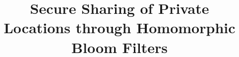\documentclass[conference]{IEEEtran}
\begin{document}
\title{Secure Sharing of Private Locations through Homomorphic Bloom Filters}



\maketitle

\begin{abstract}

\end{abstract}


%








%



{

%

}

\end{document}
